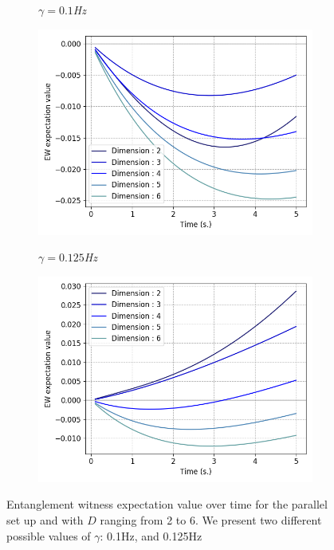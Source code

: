 \documentclass[%
 reprint,
 superscriptaddress,
 amsmath,
 amssymb,
 aps,
 longbibliography
]{revtex4-2}
\begin{document}
	\begin{figure}
	    \begin{subfigure}{.49\textwidth}
	    	\textit{$\gamma = 0.1$Hz}\par\medskip
    		\includegraphics[width=1.\columnwidth]{EW_deco_time_01.png}\par\medskip
		\end{subfigure}
	    \begin{subfigure}{.49\textwidth}
	    	\textit{$\gamma = 0.125$Hz}\par\medskip
    		\includegraphics[width=1.\columnwidth]{EW_deco_time_0125.png}\par\medskip
		\end{subfigure}
	    \caption{Entanglement witness expectation value over time for the parallel set up and with $D$ ranging from 2 to 6. We present two different possible values of $\gamma$: 0.1Hz, and 0.125Hz}
	\end{figure}
\end{document}
